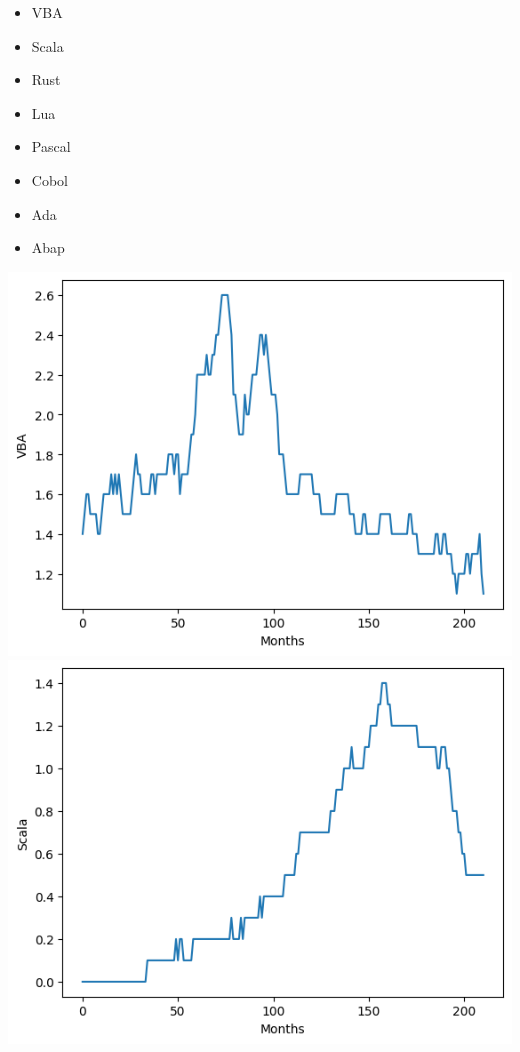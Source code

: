 \documentclass[conference]{IEEEtran}
\begin{document}
\begin{itemize}
\item{VBA}
\item{Scala}
\item{Rust}
\item{Lua}
\item{Pascal}
\item{Cobol}
\item{Ada}
\item{Abap}
\end{itemize}

\noindent
\includegraphics[scale=0.4]{lineplot/vba.png}
\includegraphics[scale=0.4]{lineplot/scala.png}
\end{document}
